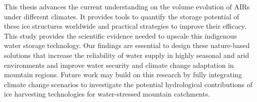 This thesis advances the current understanding on the volume evolution of AIRs under different climates. It
provides tools to quantify the storage potential of these ice structures worldwide and practical strategies to
improve their efficacy. This study provides the scientific evidence needed to upscale this indigenous water
storage technology. Our findings are essential to design these nature-based solutions that increase the
reliability of water supply in highly seasonal and arid environments and improve water security and climate
change adaptation in mountain regions. Future work may build on this research by fully integrating climate
change scenarios to investigate the potential hydrological contributions of ice harvesting technologies for
water-stressed mountain catchments.
